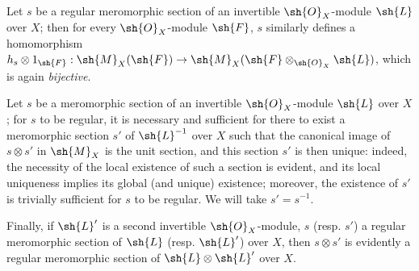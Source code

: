 \begin{env}[20.1.9]
\label{IV.20.1.9}
Let $s$ be a regular meromorphic section of an invertible $\sh{O}_X$-module $\sh{L}$ over $X$;
then for every $\sh{O}_X$-module $\sh{F}$, $s$ similarly defines a homomorphism $h_s\otimes 1_\sh{F}:\sh{M}_X(\sh{F})\to\sh{M}_X(\sh{F}\otimes_{\sh{O}_X}\sh{L})$, which is again \emph{bijective}.
\end{env}

\begin{env}[20.1.10]
\label{IV.20.1.10}
Let $s$ be a meromorphic section of an invertible $\sh{O}_X$-module $\sh{L}$ over $X$;
for $s$ to be regular, it is necessary and sufficient for there to exist a meromorphic section $s'$ of $\sh{L}^{-1}$ over $X$ such that the canonical image of $s\otimes s'$ in $\sh{M}_X$  is the unit section, and this section $s'$ is then unique:
indeed, the necessity of the local existence of such a section is evident, and its local uniqueness implies its global (and unique) existence;
moreover, the existence of $s'$ is trivially sufficient for $s$ to be regular.
We will take $s'=s^{-1}$.

Finally, if $\sh{L}'$ is a second invertible $\sh{O}_X$-module, $s$ (resp. $s'$) a regular meromorphic section of $\sh{L}$ (resp. $\sh{L}'$) over $X$, then $s\otimes s'$ is evidently a regular meromorphic section of $\sh{L}\otimes\sh{L}'$ over $X$.
\end{env}

